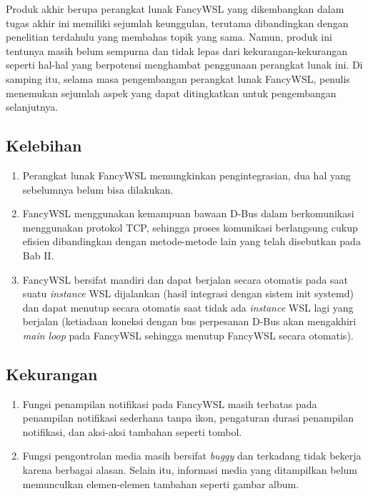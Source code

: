 Produk akhir berupa perangkat lunak FancyWSL yang dikembangkan dalam tugas akhir ini memiliki sejumlah keunggulan, terutama dibandingkan dengan penelitian terdahulu yang membahas topik yang sama. Namun, produk ini tentunya masih belum sempurna dan tidak lepas dari kekurangan-kekurangan seperti hal-hal yang berpotensi menghambat penggunaan perangkat lunak ini. Di samping itu, selama masa pengembangan perangkat lunak FancyWSL, penulis menemukan sejumlah aspek yang dapat ditingkatkan untuk pengembangan selanjutnya.

\subsection{Kelebihan}

\begin{enumerate}
    \item Perangkat lunak FancyWSL memungkinkan pengintegrasian, dua hal yang sebelumnya belum bisa dilakukan.
    \item FancyWSL menggunakan kemampuan bawaan D-Bus dalam berkomunikasi menggunakan protokol TCP, sehingga proses komunikasi berlangsung cukup efisien dibandingkan dengan metode-metode lain yang telah disebutkan pada Bab II.
    \item FancyWSL bersifat mandiri dan dapat berjalan secara otomatis pada saat suatu \textit{instance} WSL dijalankan (hasil integrasi dengan sistem init systemd) dan dapat menutup secara otomatis saat tidak ada \textit{instance} WSL lagi yang berjalan (ketiadaan koneksi dengan bus perpesanan D-Bus akan mengakhiri \textit{main loop} pada FancyWSL sehingga menutup FancyWSL secara otomatis).
\end{enumerate}

\subsection{Kekurangan}

\begin{enumerate}
    \item Fungsi penampilan notifikasi pada FancyWSL masih terbatas pada penampilan notifikasi sederhana tanpa ikon, pengaturan durasi penampilan notifikasi, dan aksi-aksi tambahan seperti tombol.

    \item Fungsi pengontrolan media masih bersifat \textit{buggy} dan terkadang tidak bekerja karena berbagai alasan. Selain itu, informasi media yang ditampilkan belum memunculkan elemen-elemen tambahan seperti gambar album.
\end{enumerate}


